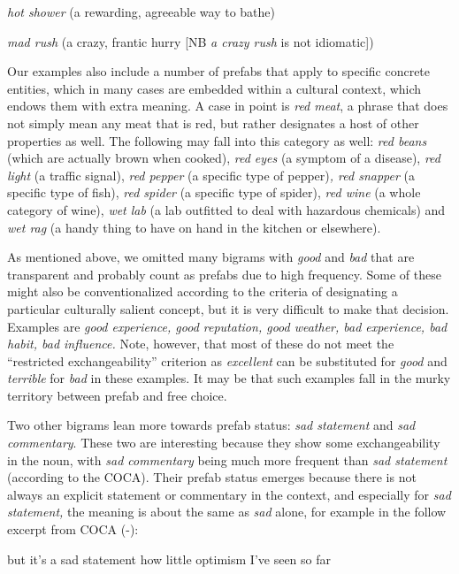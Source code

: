 \documentclass[output=paper]{langscibook}
\begin{document}
\textit{hot shower} (a rewarding, agreeable way to bathe)

\textit{mad rush} (a crazy, frantic hurry [NB \textit{a crazy rush} is not idiomatic])
\z

Our examples also include a number of prefabs that apply to specific concrete entities, which in many cases are embedded within a cultural context, which endows them with extra meaning. A case in point is \textit{red meat}, a phrase that does not simply mean any meat that is red, but rather designates a host of other properties as well. The following may fall into this category as well: \textit{red beans} (which are actually brown when cooked), \textit{red eyes} (a symptom of a disease), \textit{red light} (a traffic signal), \textit{red pepper} (a specific type of pepper)\textit{, red snapper} (a specific type of fish), \textit{red spider} (a specific type of spider), \textit{red wine} (a whole category of wine), \textit{wet lab} (a lab outfitted to deal with hazardous chemicals) and \textit{wet rag} (a handy thing to have on hand in the kitchen or elsewhere).

As mentioned above, we omitted many bigrams with \textit{good} and \textit{bad} that are transparent and probably count as prefabs due to high frequency. Some of these might also be conventionalized according to the criteria of designating a particular culturally salient concept, but it is very difficult to make that decision. Examples are \textit{good experience, good reputation, good weather, bad experience, bad habit, bad influence.} Note, however, that most of these do not meet the ``restricted exchangeability'' criterion as \textit{excellent} can be substituted for \textit{good} and \textit{terrible} for \textit{bad} in these examples. It may be that such examples fall in the murky territory between prefab and free choice. 

Two other bigrams lean more towards prefab status: \textit{sad statement} and \textit{sad commentary}. These two are interesting because they show some exchangeability in the noun, with \textit{sad commentary} being much more frequent than \textit{sad statement} (according to the COCA). Their prefab status emerges because there is not always an explicit statement or commentary in the context, and especially for \textit{sad statement,} the meaning is about the same as \textit{sad} alone, for example in the follow excerpt from COCA (\citealt{Davies2008}-):

\ea\label{ex:bybee:6}
 but it's a sad statement how little optimism I've seen so far
\z
\end{document}
